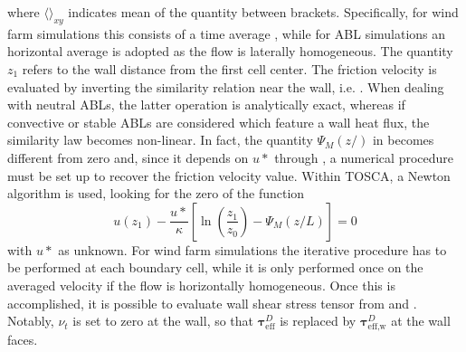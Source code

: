 where $\langle\rangle_{xy}$ indicates mean of the quantity between brackets. Specifically, for wind farm simulations this consists of a time average \citep{YangEtAl2017}, while for ABL simulations an horizontal average is adopted as the flow is laterally homogeneous. The quantity $z_1$ refers to the wall distance from the first cell center. The friction velocity is evaluated by inverting the similarity relation near the wall, i.e. . When dealing with neutral ABLs, the latter operation is analytically exact, whereas if convective or stable ABLs are considered which feature a wall heat flux, the similarity law becomes non-linear. In fact, the quantity $\Psi_M(z/)$ in   becomes different from zero and, since it depends on $u*$ through , a numerical procedure must be set up to recover the friction velocity value. Within TOSCA, a Newton algorithm is used, looking for the zero of the function
\begin{equation}
	u(z_1) - \frac{u*}{\kappa}\left[\ln\left(\frac{z_1}{z_{0}}\right) - \Psi_M(z/L)\right] = 0	
\end{equation}
with $u*$ as unknown. For wind farm simulations the iterative procedure has to be performed at each boundary cell, while it is only performed once on the averaged velocity if the flow is horizontally homogeneous. Once this is accomplished, it is possible to evaluate wall shear stress tensor from  and . Notably, $\nu_t$ is set to zero at the wall, so that $\mathbf{\tau}_\text{eff}^D$ is replaced by $\mathbf{\tau}_\text{eff,w}^D$ at the wall faces. 

